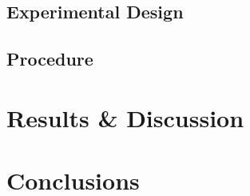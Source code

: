 \documentclass[twoside]{article}
\begin{document}
\subsection{Experimental Design}
\label{sec:exp_design}


\subsection{Procedure}
\label{sec:procedure}



\section{Results \& Discussion}
\label{sec:res_and_dis}



\section{Conclusions}
\label{sec:conclusions}





%


\end{document}
